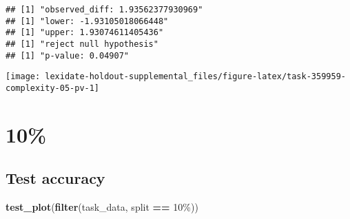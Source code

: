 \documentclass[
]{book}
\newenvironment{Shaded}{\begin{snugshade}}{\end{snugshade}}
\newcommand{\AttributeTok}[1]{\textcolor[rgb]{0.13,0.29,0.53}{#1}}
\newcommand{\DecValTok}[1]{\textcolor[rgb]{0.00,0.00,0.81}{#1}}
\newcommand{\FunctionTok}[1]{\textcolor[rgb]{0.13,0.29,0.53}{\textbf{#1}}}
\newcommand{\NormalTok}[1]{#1}
\newcommand{\OtherTok}[1]{\textcolor[rgb]{0.56,0.35,0.01}{#1}}
\newcommand{\SpecialCharTok}[1]{\textcolor[rgb]{0.81,0.36,0.00}{\textbf{#1}}}
\newcommand{\StringTok}[1]{\textcolor[rgb]{0.31,0.60,0.02}{#1}}
\begin{document}
\begin{Shaded}
\end{Shaded}

\begin{verbatim}
## [1] "observed_diff: 1.93562377930969"
## [1] "lower: -1.93105018066448"
## [1] "upper: 1.93074611405436"
## [1] "reject null hypothesis"
## [1] "p-value: 0.04907"
\end{verbatim}

\texttt{[image: lexidate-holdout-supplemental\_files/figure-latex/task-359959-complexity-05-pv-1]}

\hypertarget{section-36}{%
\section{10\%}\label{section-36}}

\hypertarget{test-accuracy-36}{%
\subsection{Test accuracy}\label{test-accuracy-36}}

\begin{Shaded}
\begin{Highlighting}[]
\FunctionTok{test\_plot}\NormalTok{(}\FunctionTok{filter}\NormalTok{(task\_data, split }\SpecialCharTok{==} \StringTok{\textquotesingle{}10\%\textquotesingle{}}\NormalTok{))}
\end{Highlighting}
\end{Shaded}
\end{document}
